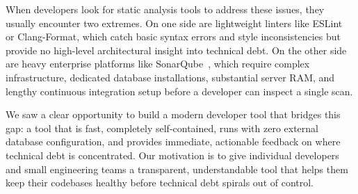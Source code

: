 When developers look for static analysis tools to address these issues, they usually encounter two extremes. On one side are lightweight linters like ESLint~\cite{eslint} or Clang-Format, which catch basic syntax errors and style inconsistencies but provide no high-level architectural insight into technical debt. On the other side are heavy enterprise platforms like SonarQube~\cite{sonarqube}, which require complex infrastructure, dedicated database installations, substantial server RAM, and lengthy continuous integration setup before a developer can inspect a single scan. 

We saw a clear opportunity to build a modern developer tool that bridges this gap: a tool that is fast, completely self-contained, runs with zero external database configuration, and provides immediate, actionable feedback on where technical debt is concentrated. Our motivation is to give individual developers and small engineering teams a transparent, understandable tool that helps them keep their codebases healthy before technical debt spirals out of control.


